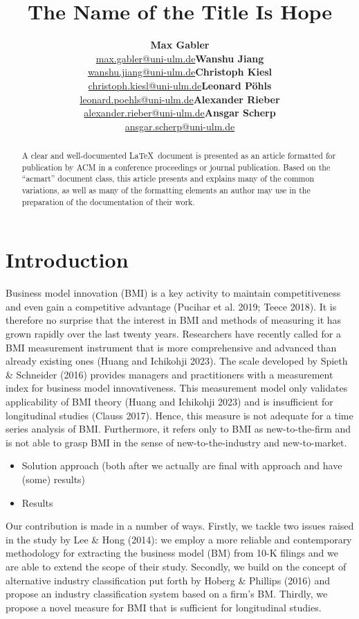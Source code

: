 \documentclass[
]{article}
\title{The Name of the Title Is Hope}
\author{\textbf{Max
Gabler}\\\href{mailto:max.gabler@uni-ulm.de}{max.gabler@uni-ulm.de}\asep\textbf{Wanshu
Jiang}\\\href{mailto:wanshu.jiang@uni-ulm.de}{wanshu.jiang@uni-ulm.de}\asep\textbf{Christoph
Kiesl}\\\href{mailto:christoph.kiesl@uni-ulm.de}{christoph.kiesl@uni-ulm.de}\asep\textbf{Leonard
Pöhls}\\\href{mailto:leonard.poehls@uni-ulm.de}{leonard.poehls@uni-ulm.de}\asep\textbf{Alexander
Rieber}\\\href{mailto:alexander.rieber@uni-ulm.de}{alexander.rieber@uni-ulm.de}\asep\textbf{Ansgar
Scherp}\\\href{mailto:ansgar.scherp@uni-ulm.de}{ansgar.scherp@uni-ulm.de}}
\date{}
\renewcommand*\contentsname{Table of contents}
\newcommand\contentsname{Table of contents}
\begin{document}
\maketitle
\begin{abstract}
A clear and well-documented \LaTeX~document is presented as an article
formatted for publication by ACM in a conference proceedings or journal
publication. Based on the ``acmart'' document class, this article
presents and explains many of the common variations, as well as many of
the formatting elements an author may use in the preparation of the
documentation of their work.
\end{abstract}

\renewcommand*\contentsname{Table of contents}
{
\hypersetup{linkcolor=}
\setcounter{tocdepth}{3}
\tableofcontents
}
\section{Introduction}\label{introduction}

Business model innovation (BMI) is a key activity to maintain
competitiveness and even gain a competitive advantage (Pucihar et al.
2019; Teece 2018). It is therefore no surprise that the interest in BMI
and methods of measuring it has grown rapidly over the last twenty
years. Researchers have recently called for a BMI measurement instrument
that is more comprehensive and advanced than already existing ones
(Huang and Ichikohji 2023). The scale developed by Spieth \& Schneider
(2016) provides managers and practitioners with a measurement index for
business model innovativeness. This measurement model only validates
applicability of BMI theory (Huang and Ichikohji 2023) and is
insufficient for longitudinal studies (Clauss 2017). Hence, this measure
is not adequate for a time series analysis of BMI. Furthermore, it
refers only to BMI as new-to-the-firm and is not able to grasp BMI in
the sense of new-to-the-industry and new-to-market.

\begin{itemize}
\item
  Solution approach (both after we actually are final with approach and
  have (some) results)
\item
  Results
\end{itemize}

Our contribution is made in a number of ways. Firstly, we tackle two
issues raised in the study by Lee \& Hong (2014): we employ a more
reliable and contemporary methodology for extracting the business model
(BM) from 10-K filings and we are able to extend the scope of their
study. Secondly, we build on the concept of alternative industry
classification put forth by Hoberg \& Phillips (2016) and propose an
industry classification system based on a firm's BM. Thirdly, we propose
a novel measure for BMI that is sufficient for longitudinal studies.
\end{document}
